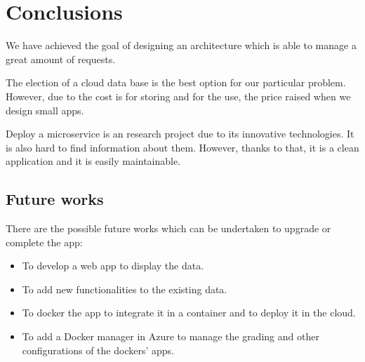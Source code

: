 \documentclass[12pt]{report} %
\begin{document}
\section{Conclusions}

We have achieved the goal of designing an architecture which is able to manage a great amount of requests.

The election of a cloud data base is the best option for our particular problem. However, due to the cost is for storing and for the use, the price raised when we design small apps.

Deploy a microservice is an research project due to its innovative technologies. It is also hard to find information about them. However, thanks to that, it is a clean application and it is easily maintainable. 

\subsection{Future works}

There are the possible future works which can be undertaken to upgrade or complete the app:

\begin{itemize}
	\item To develop a web app to display the data. 
	\item To add new functionalities to the existing data.
	\item To docker the app to integrate it in a container and to deploy it in the cloud.
	\item To add a Docker manager in Azure to manage the grading and other configurations of the dockers' apps.	
\end{itemize}



\clearpage
{}
\printbibliography




\end{document}
